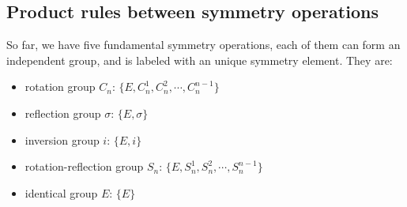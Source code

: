 \subsection{Product rules between symmetry operations}
%
%
So far, we have five fundamental symmetry operations, each of them can
form an independent group, and is labeled with an unique symmetry
element. They are:
\begin{itemize}
\item rotation group $C_{n}$: $\{E, C^{1}_{n}, C^{2}_{n}, \cdots,
  C^{n-1}_{n}\}$
\item reflection group $\sigma$: $\{E, \sigma \}$
\item inversion group $i$: $\{E, i \}$
\item rotation-reflection group $S_{n}$: $\{E, S^{1}_{n}, S^{2}_{n},
  \cdots, S^{n-1}_{n} \}$
\item identical group $E$: $\{E \}$
\end{itemize}

